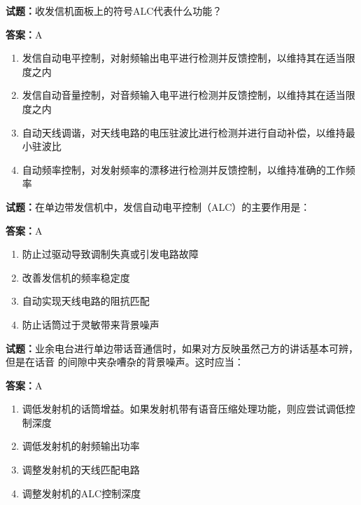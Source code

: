 \documentclass{ctexbook}
\begin{document}
\textbf{试题：}收发信机面板上的符号ALC代表什么功能？ 

\textbf{答案：}A 

\begin{enumerate}[leftmargin=3em]
  \item 发信自动电平控制，对射频输出电平进行检测并反馈控制，以维持其在适当限度之内 

  \item 发信自动音量控制，对音频输入电平进行检测并反馈控制，以维持其在适当限度之内 

  \item 自动天线调谐，对天线电路的电压驻波比进行检测并进行自动补偿，以维持最小驻波比 

  \item 自动频率控制，对发射频率的漂移进行检测并反馈控制，以维持准确的工作频率 

\end{enumerate}





\vspace{1em}

\textbf{试题：}在单边带发信机中，发信自动电平控制（ALC）的主要作用是： 

\textbf{答案：}A 

\begin{enumerate}[leftmargin=3em]
  \item 防止过驱动导致调制失真或引发电路故障 

  \item 改善发信机的频率稳定度 


  \item 自动实现天线电路的阻抗匹配 

  \item 防止话筒过于灵敏带来背景噪声 

\end{enumerate}





\vspace{1em}

\textbf{试题：}业余电台进行单边带话音通信时，如果对方反映虽然己方的讲话基本可辨，但是在话音
的间隙中夹杂嘈杂的背景噪声。这时应当： 

\textbf{答案：}A 

\begin{enumerate}[leftmargin=3em]
  \item 调低发射机的话筒增益。如果发射机带有语音压缩处理功能，则应尝试调低控制深度 

  \item 调低发射机的射频输出功率 

  \item 调整发射机的天线匹配电路 

  \item 调整发射机的ALC控制深度 

\end{enumerate}
\end{document}
